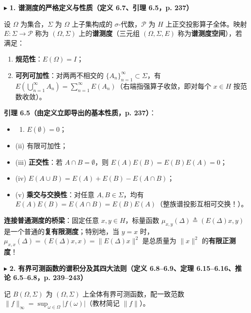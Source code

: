\documentclass[11pt,a4paper]{article}
\providecommand{\tightlist}{\setlength{\itemsep}{1.8pt}\setlength{\parskip}{0pt}}
\newcommand{\SubSubHeading}[1]{%
  \Needspace{6.5\baselineskip}\vspace{5.5pt}\noindent
  \textcolor{AccentMain}{\scriptsize$\blacktriangleright$}\hspace{4pt}%
  {\small\bfseries\color{AccentMain}#1}\par\nopagebreak[4]\vspace{2.5pt}%
}
\renewenvironment{quote}{%
  \begin{tcolorbox}[
    enhanced,
    breakable,
    colback=AccentSoft!48!white,
    colframe=AccentMain,
    boxrule=0pt,
    leftrule=2.8pt,
    arc=2.5pt,
    left=9pt, right=8pt, top=6pt, bottom=6pt,
    before skip=5.5pt, after skip=5.5pt
  ]\small
}{%
  \end{tcolorbox}%
}
\begin{document}
\SubSubHeading{1. 谱测度的严格定义与性质（定义 6.7、引理 6.5，p. 237）}

设 \(\Omega\) 为集合，\(\Sigma\) 为 \(\Omega\) 上子集构成的 \(\sigma\)-代数，\(\mathcal{P}\) 为 \(H\) 上正交投影算子全体。映射 \(E : \Sigma \to \mathcal{P}\) 称为 \((\Omega, \Sigma)\) 上的\textbf{谱测度}（三元组 \((\Omega, \Sigma, E)\) 称为\textbf{谱测度空间}），若满足：

\begin{enumerate}
\def\labelenumi{\arabic{enumi}.}
\tightlist
\item
  \textbf{规范性}：\(E(\Omega) = I\)；
\item
  \textbf{可列可加性}：对两两不相交的 \(\{A_n\}_{n=1}^\infty \subset \Sigma\)，有 \(E\left(\bigcup_{n=1}^\infty A_n\right) = \sum_{n=1}^\infty E(A_n)\)（右端指强算子收敛，即对每个 \(x \in H\) 按范数收敛）。
\end{enumerate}

\textbf{引理 6.5（由定义立即导出的基本性质，p. 237）}：

\begin{itemize}
\tightlist
\item
  \begin{enumerate}
  \def\labelenumi{(\roman{enumi})}
  \tightlist
  \item
    \(E(\emptyset) = 0\)；
  \end{enumerate}
\item
  (ii) 有限可加性；
\item
  (iii) \textbf{正交性}：若 \(A \cap B = \emptyset\)，则 \(E(A)E(B) = E(B)E(A) = 0\)；
\item
  (iv) \(E(A \cup B) = E(A) + E(B) - E(A \cap B)\)；
\item
  (v) \textbf{乘交与交换性}：对任意 \(A, B \in \Sigma\)，均有 \(E(A)E(B) = E(A \cap B) = E(B)E(A)\)（整族谱投影互相可交换！）。
\end{itemize}

\begin{quote}
\textbf{连接普通测度的桥梁}：固定任意 \(x, y \in H\)，标量函数 \(\mu_{x,y}(\Delta) \triangleq (E(\Delta)x, y)\) 是一个普通的\textbf{复有限测度}；特别地，当 \(y = x\) 时，\(\mu_{x,x}(\Delta) = (E(\Delta)x, x) = \|E(\Delta)x\|^2\) 是总质量为 \(\|x\|^2\) 的\textbf{有限正测度}！
\end{quote}

\SubSubHeading{2. 有界可测函数的谱积分及其四大法则（定义 6.8--6.9、定理 6.15--6.16、推论 6.5--6.8，p. 239--243）}

记 \(B(\Omega, \Sigma)\) 为 \((\Omega, \Sigma)\) 上全体有界可测函数，配一致范数 \(\|f\|_\infty = \sup_{\omega \in \Omega}|f(\omega)|\)（教材简记 \(\|f\|\)）。
\end{document}

